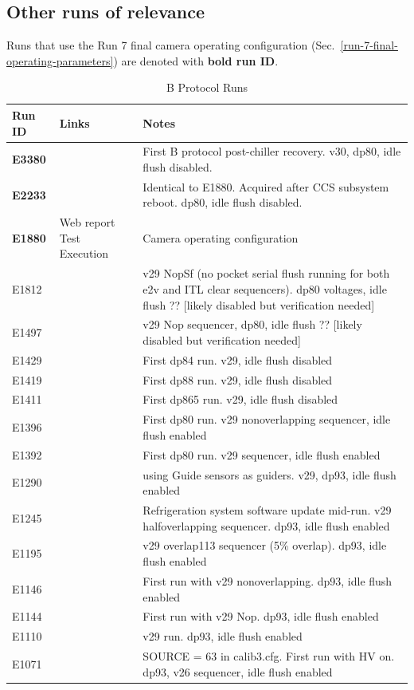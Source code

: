 \subsection{Other runs of relevance}\label{relevant-runs}

Runs that use the Run 7 final camera operating configuration (Sec.~\ref{run-7-final-operating-parameters}) are denoted with \textbf{bold run ID}.

\begin{table}[ht]\label{table:runs_BProtocol}
\centering
\caption{B Protocol Runs}
\begin{tabular}{|p{1.5cm}|p{2.9cm}|p{9cm}|}
\hline
Run ID & Links & Notes \\ \hline
\textbf{E3380} & & First B protocol post-chiller recovery. v30, dp80, idle flush disabled. \\ \hline
\textbf{E2233} & & Identical to E1880. Acquired after CCS subsystem reboot. dp80, idle flush disabled. \\ \hline
\textbf{E1880}  &  Web report \newline Test Execution & Camera operating configuration \\ \hline
E1812 & & v29 NopSf (no pocket serial flush running for both e2v and ITL clear sequencers). dp80 voltages, idle flush ?? [likely disabled but verification needed] \\ \hline
E1497 & & v29 Nop sequencer, dp80, idle flush ?? [likely disabled but verification needed] \\ \hline
E1429 & & First dp84 run. v29, idle flush disabled \\ \hline
E1419 & & First dp88 run. v29, idle flush disabled \\ \hline
E1411 & & First dp865 run. v29, idle flush disabled \\ \hline
E1396 & & First dp80 run. v29 nonoverlapping sequencer, idle flush enabled \\ \hline
E1392 & & First dp80 run. v29 sequencer, idle flush enabled \\ \hline
E1290 & & using Guide sensors as guiders. v29, dp93, idle flush enabled \\ \hline
E1245 & & Refrigeration system software update mid-run. v29 halfoverlapping sequencer. dp93, idle flush enabled \\ \hline
E1195 & & v29 overlap113 sequencer (5\% overlap). dp93, idle flush enabled \\ \hline
E1146 & & First run with v29 nonoverlapping. dp93, idle flush enabled \\ \hline
E1144 & & First run with v29 Nop. dp93, idle flush enabled \\ \hline
E1110 & & v29 run. dp93, idle flush enabled \\ \hline
E1071 & & SOURCE = 63 in calib3.cfg. First run with HV on. dp93, v26 sequencer, idle flush enabled \\ \hline

\end{tabular}
\end{table}

